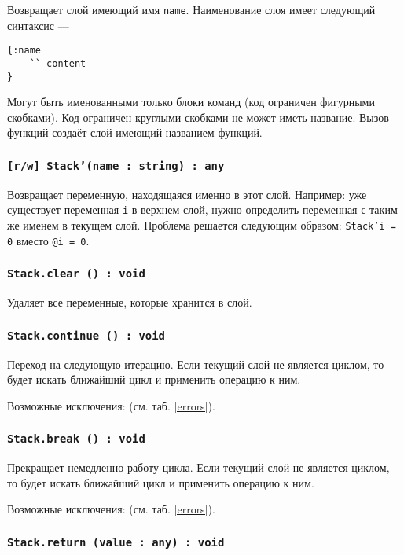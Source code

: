 Возвращает слой имеющий имя \texttt{name}. Наименование слоя имеет следующий синтаксис —
\begin{verbatim}
{:name
	`` content
}
\end{verbatim}
Могут быть именованными только блоки команд (код ограничен фигурными скобками). Код ограничен круглыми скобками не может иметь название. Вызов функций создаёт слой имеющий названием функций.

\subsubsection{\texttt{[r/w] Stack'(name : string) : any}}

Возвращает переменную, находящаяся именно в этот слой. Например: уже существует переменная \texttt{i} в верхнем слой, нужно определить переменная с таким же именем в текущем слой. Проблема решается следующим образом: \texttt{Stack'i = 0} вместо \texttt{@i = 0}.

\subsubsection{\texttt{Stack.clear () : void}}

Удаляет все переменные, которые хранится в слой.

\subsubsection{\texttt{Stack.continue () : void}}

Переход на следующую итерацию. Если текущий слой не является циклом, то будет искать ближайший цикл и применить операцию к ним.

Возможные исключения:  (см. таб. \ref{errors}).

\subsubsection{\texttt{Stack.break () : void}}

Прекращает немедленно работу цикла. Если текущий слой не является циклом, то будет искать ближайший цикл и применить операцию к ним.

Возможные исключения:  (см. таб. \ref{errors}).

\subsubsection{\texttt{Stack.return (value : any) : void}}

